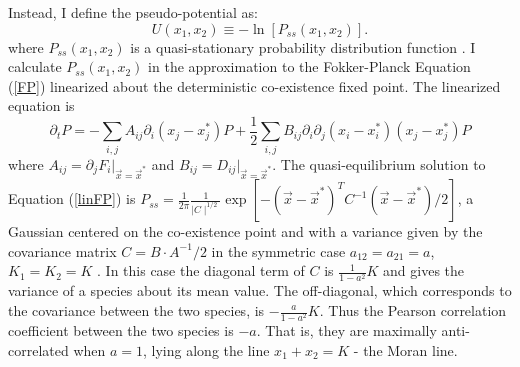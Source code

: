 Instead, I define the pseudo-potential as:
\begin{equation}
U(x_1,x_2) \equiv -\ln\left[P_{ss}(x_1,x_2)\right].
\label{quasipotential}
\end{equation}
where $P_{ss}(x_1,x_2)$ is a quasi-stationary probability distribution function \cite{Zhou2012}. 
I calculate $P_{ss}(x_1,x_2)$ in the approximation to the Fokker-Planck Equation (\ref{FP}) linearized about the deterministic co-existence fixed point. 
The linearized equation is
\begin{equation}
\partial_t P = -\sum_{i,j} A_{ij}\partial_i (x_j-x_j^*) P + \frac{1}{2} \sum_{i,j} B_{ij} \partial_i\partial_j (x_i-x_i^*) (x_j-x_j^*) P
\label{linFP}
\end{equation}
where $A_{ij}=\partial_j F_i \lvert_{\vec{x}=\vec{x}^*}$ and $B_{ij}=D_{ij} \lvert_{\vec{x}=\vec{x}^*}$.
The quasi-equilibrium solution to Equation (\ref{linFP}) is $P_{ss}=\frac{1}{2\pi}\frac{1}{\mid C\mid^{1/2}}\exp[-(\vec{x} - \vec{x}^*)^T C^{-1}(\vec{x} - \vec{x}^*)/2]$, a Gaussian centered on the co-existence point and with a variance given by the covariance matrix $C=B\cdot A^{-1}/2$ in the symmetric case $a_{12}=a_{21}=a$, $K_1=K_2=K$ \cite{VanKampen1992}. 
In this case the diagonal term of $C$ is $\frac{1}{1-a^2}K$ and gives the variance of a species about its mean value. 
The off-diagonal, which corresponds to the covariance between the two species, is $-\frac{a}{1-a^2}K$. 
Thus the Pearson correlation coefficient between the two species is $-a$. 
That is, they are maximally anti-correlated when $a=1$, lying along the line $x_1 + x_2 = K$ - the Moran line. 

